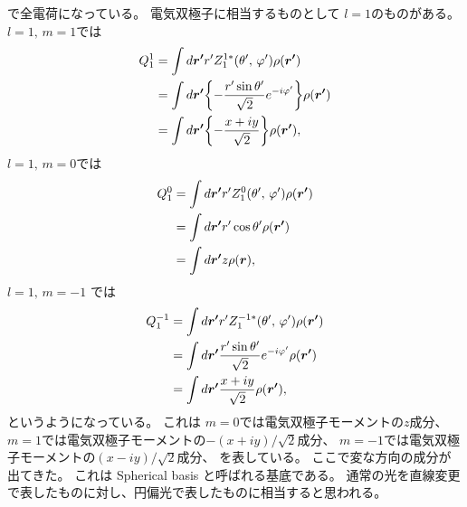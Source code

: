 \documentclass[../../master.tex]{subfiles}
\begin{document}
で全電荷になっている。
電気双極子に相当するものとして
\(l=1\)のものがある。
\(l=1,\,m = 1\)では
\begin{align}
    Q_1^{ 1}
    &= \int d\vb*{r'}  r' Z_1^{1*} (\theta',\,\varphi') \rho(\vb*{r'})\\
    &= \int d\vb*{r'} \qty{- \frac{r'\sin\theta'}{\sqrt{2}}e^{- i\varphi'}} \rho(\vb*{r'})\\
    &= \int d\vb*{r'} \qty{- \frac{x+iy}{\sqrt{2}}} \rho(\vb*{r'}),
\end{align}
\(l=1,\,m=0\)では
\begin{align}
    Q_1^0
    &= \int d\vb*{r'}  r' Z_1^0 (\theta',\,\varphi') \rho(\vb*{r'})\\
    &= \int d\vb*{r'}  r' \cos\theta' \rho(\vb*{r'})\\
    &= \int d\vb*{r'} z \rho(\vb*{r}),
\end{align}
\(l=1,\,m=-1\) では
\begin{align}
    Q_1^{- 1}
    &= \int d\vb*{r'}  r' Z_1^{- 1*} (\theta',\,\varphi') \rho(\vb*{r'})\\
    &= \int d\vb*{r'} \frac{r'\sin\theta'}{\sqrt{2}}e^{- i\varphi'} \rho(\vb*{r'})\\
    &= \int d\vb*{r'} \frac{x+iy}{\sqrt{2}} \rho(\vb*{r'}),
\end{align}
というようになっている。
これは
\(m=0\)では電気双極子モーメントの\(z\)成分、
\(m=1\)では電気双極子モーメントの\(-(x+iy)/\sqrt{2}\)成分、
\(m=-1\)では電気双極子モーメントの\((x-iy)/\sqrt{2}\)成分、
を表している。
ここで変な方向の成分が出てきた。
これは Spherical basis と呼ばれる基底である。
通常の光を直線変更で表したものに対し、円偏光で表したものに相当すると思われる。

\end{document}
